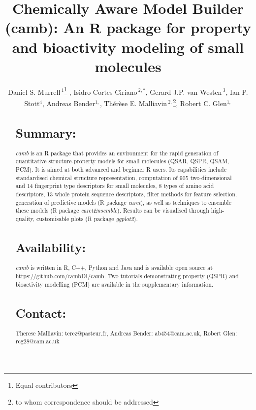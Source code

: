 \documentclass{bioinfo}
\begin{document}

\title{Chemically Aware Model Builder (camb): An R package for property and bioactivity modeling of small molecules}
\author[Murrell \& Cortes-Ciriano \it{et~al}]{Daniel S. Murrell\,$^{1}$\footnote{Equal contributors} , Isidro Cortes-Ciriano\,$^{2,*}$, Gerard J.P. van Westen\,$^{3}$, Ian P. Stott$^{4}$, Andreas Bender$^{1,}$\dag, Th\'er\`ese E. Malliavin\,$^{2,}$\footnote{to whom correspondence should be addressed},  Robert C. Glen$^{1,}$\dag}
\address{$^{1}$Unilever Centre for Molecular Science Informatics, Department of Chemistry, University of Cambridge, Lensfield Road, Cambridge CB2 1EW, United Kingdom.\\
$^{2}$Unite de Bioinformatique Structurale, Institut Pasteur and CNRS UMR 3825, Structural Biology and Chemistry Department, 25, rue Dr. Roux, 75 724 Paris, France.\\
$^{3}$European Molecular Biology Laboratory European Bioinformatics Institute Wellcome Trust Genome Campus, Hinxton, United Kingdom.\\
$^{4}$Unilever Research, Bebington, UK}


\maketitle

\begin{abstract}
\section{Summary:}
{\it camb} is an R package that provides an environment for the rapid generation of quantitative structure-property models for small molecules (QSAR, QSPR, QSAM, PCM). It is aimed at both advanced and beginner R users.
Its capabilities include standardised chemical structure representation, computation of 905 two-dimensional and 14 fingerprint type descriptors for small molecules, 8 types of amino acid descriptors, 13 whole protein sequence descriptors, filter methods for feature selection, generation of predictive models (R package {\it caret}), as well as techniques to ensemble these models (R package {\it caretEnsemble}).
Results can be visualised through high-quality, customisable plots (R package {\it ggplot2}).
\section{Availability:} {\it camb} is written in R, C++, Python and Java and is available open source
at https://github.com/cambDI/camb.
Two tutorials demonstrating property (QSPR) and bioactivity modelling (PCM) are available in the supplementary information.\\
\section{Contact:} Therese Malliavin: terez@pasteur.fr, Andreas Bender: ab454@cam.ac.uk, Robert Glen: rcg28@cam.ac.uk
\end{abstract}
\end{document}
